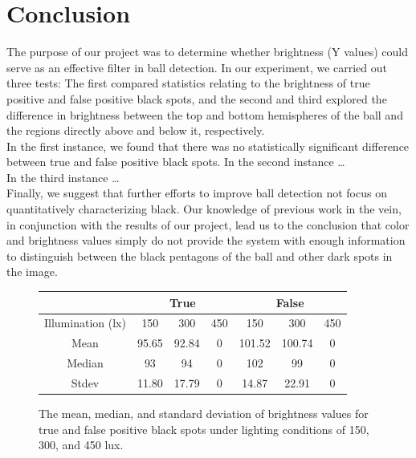 \documentclass[11pt, twocolumn]{article}
\begin{document}
\section{Conclusion}
The purpose of our project was to determine whether brightness (Y values) could serve as an effective filter in ball detection. In our experiment, we carried out three tests: The first compared statistics relating to the brightness of true positive and false positive black spots, and the second and third explored the difference in brightness between the top and bottom hemispheres of the ball and the regions directly above and below it, respectively. \\
\indent In the first instance, we found that there was no statistically significant difference between true and false positive black spots.
\indent In the second instance \ldots \\
\indent In the third instance \ldots \\
Finally, we suggest that further efforts to improve ball detection not focus on quantitatively characterizing black. Our knowledge of previous work in the vein, in conjunction with the results of our project, lead us to the conclusion that color and brightness values simply do not provide the system with enough information to distinguish between the black pentagons of the ball and other dark spots in the image.

\onecolumn
\begin{figure}
\label{fig:table}
\centering
\begin{tabular}{ccccccc}
\toprule
 & \multicolumn{3}{c}{True} & \multicolumn{3}{c}{False} \\
\midrule
Illumination (lx) & 150 & 300 & 450 & 150 & 300 & 450 \\
\midrule
Mean & 95.65 & 92.84 & 0 & 101.52 & 100.74 & 0 \\
Median & 93 & 94 & 0 & 102 & 99 & 0 \\
Stdev & 11.80 & 17.79 & 0 & 14.87 & 22.91 & 0 \\
\bottomrule
\end{tabular}
\caption{The mean, median, and standard deviation of brightness values for true and false positive black spots under lighting conditions of 150, 300, and 450 lux.}
\end{figure}
\end{document}
